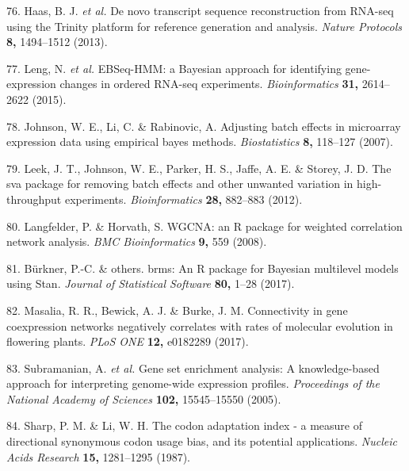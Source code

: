 \documentclass[12pt,]{article}
\begin{document}
\hypertarget{ref-Haas:2013jq}{}
76. Haas, B. J. \emph{et al.} De novo transcript sequence reconstruction
from RNA-seq using the Trinity platform for reference generation and
analysis. \emph{Nature Protocols} \textbf{8,} 1494--1512 (2013).

\hypertarget{ref-Leng:2015dw}{}
77. Leng, N. \emph{et al.} EBSeq-HMM: a Bayesian approach for
identifying gene-expression changes in ordered RNA-seq experiments.
\emph{Bioinformatics} \textbf{31,} 2614--2622 (2015).

\hypertarget{ref-johnson:2007adj}{}
78. Johnson, W. E., Li, C. \& Rabinovic, A. Adjusting batch effects in
microarray expression data using empirical bayes methods.
\emph{Biostatistics} \textbf{8,} 118--127 (2007).

\hypertarget{ref-Leek:2012ee}{}
79. Leek, J. T., Johnson, W. E., Parker, H. S., Jaffe, A. E. \& Storey,
J. D. The sva package for removing batch effects and other unwanted
variation in high-throughput experiments. \emph{Bioinformatics}
\textbf{28,} 882--883 (2012).

\hypertarget{ref-Langfelder:2008bd}{}
80. Langfelder, P. \& Horvath, S. WGCNA: an R package for weighted
correlation network analysis. \emph{BMC Bioinformatics} \textbf{9,} 559
(2008).

\hypertarget{ref-burkner2017brms}{}
81. Bürkner, P.-C. \& others. brms: An R package for Bayesian multilevel
models using Stan. \emph{Journal of Statistical Software} \textbf{80,}
1--28 (2017).

\hypertarget{ref-Masalia:2017ki}{}
82. Masalia, R. R., Bewick, A. J. \& Burke, J. M. Connectivity in gene
coexpression networks negatively correlates with rates of molecular
evolution in flowering plants. \emph{PLoS ONE} \textbf{12,} e0182289
(2017).

\hypertarget{ref-subramanian2005gene}{}
83. Subramanian, A. \emph{et al.} Gene set enrichment analysis: A
knowledge-based approach for interpreting genome-wide expression
profiles. \emph{Proceedings of the National Academy of Sciences}
\textbf{102,} 15545--15550 (2005).

\hypertarget{ref-Sharp:1987tz}{}
84. Sharp, P. M. \& Li, W. H. The codon adaptation index - a measure of
directional synonymous codon usage bias, and its potential applications.
\emph{Nucleic Acids Research} \textbf{15,} 1281--1295 (1987).
\end{document}
